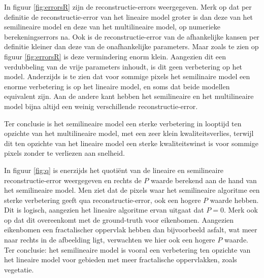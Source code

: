 \documentclass[12pt]{report}
\begin{document}
In figuur \ref{fig:errorsR} zijn de reconstructie-errors weergegeven. Merk op dat per definitie de reconstructie-error van het lineaire model groter is dan deze van het semilineaire model en deze van het multilineaire model, op numerieke berekeningserrors na. Ook is de reconstructie-error van de afhankelijke kansen per definitie kleiner dan deze van de onafhankelijke parameters. Maar zoals te zien op figuur \ref{fig:errorsR} is deze vermindering enorm klein. Aangezien dit een verdubbeling van de vrije parameters inhoudt, is dit geen verbetering op het model. Anderzijds is te zien dat voor sommige pixels het semilinaire model een enorme verbetering is op het lineaire model, en soms dat beide modellen equivalent zijn. Aan de andere kant hebben het semilineaire en het multilineaire model bijna altijd een weinig verschillende reconstructie-error. 

Ter conclusie is het semilineaire model een sterke verbetering in looptijd ten opzichte van het multilineaire model, met een zeer klein kwaliteitsverlies, terwijl dit ten opzichte van het lineaire model een sterke kwaliteitswinst is voor sommige pixels zonder te verliezen aan snelheid.

In figuur \ref{fig:q} is enerzijds het quoti\"ent van de lineaire en semilineaire reconstructie-error weergegeven en rechts de $P$ waarde berekend aan de hand van het semilineaire model. Men ziet dat de pixels waar het semilineaire algoritme een sterke verbetering geeft qua reconstructie-error, ook een hogere $P$ waarde hebben. Dit is logisch, aangezien het lineaire algoritme ervan uitgaat dat $P=0$. Merk ook op dat dit overeenkomt met de ground-truth voor eikenbomen. Aangezien eikenbomen een fractalischer oppervlak hebben dan bijvoorbeeld asfalt, wat meer naar rechts in de afbeelding ligt, verwachten we hier ook een hogere $P$ waarde. Ter conclusie: het semilineaire model is vooral een verbetering ten opzichte van het lineaire model voor gebieden met meer fractalische oppervlakken, zoals vegetatie.
\end{document}
